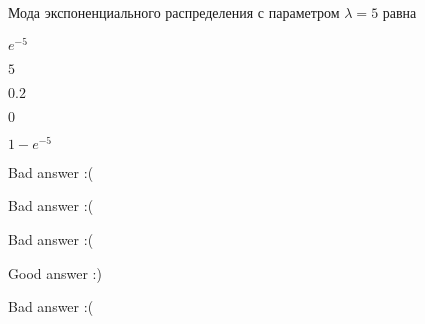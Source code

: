
\begin{question}
Мода экспоненциального распределения с параметром \(\lambda=5\) равна
\begin{answerlist}
  \item \(e^{-5}\)
  \item \(5\)
  \item \(0.2\)
  \item \(0\)
  \item \(1-e^{-5}\)
\end{answerlist}
\end{question}

\begin{solution}
\begin{answerlist}
  \item Bad answer :(
  \item Bad answer :(
  \item Bad answer :(
  \item Good answer :)
  \item Bad answer :(
\end{answerlist}
\end{solution}

